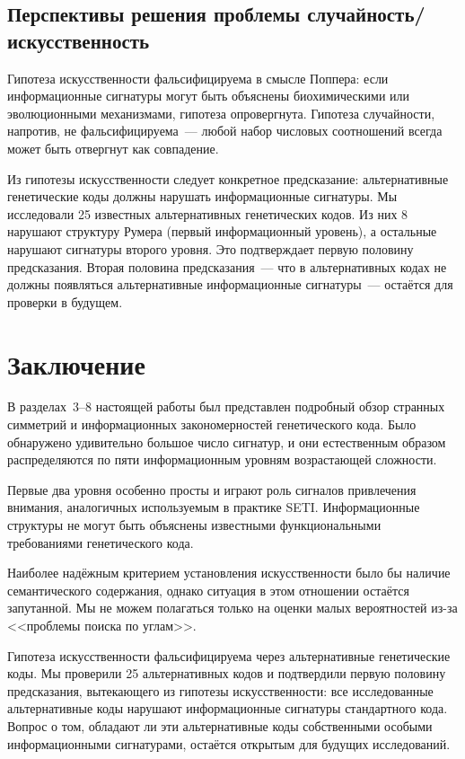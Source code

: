 \documentclass[12pt]{article}
\begin{document}
\subsection{Перспективы решения проблемы случайность/искусственность}

Гипотеза искусственности фальсифицируема в смысле Поппера: если информационные сигнатуры могут быть объяснены биохимическими или эволюционными механизмами, гипотеза опровергнута. Гипотеза случайности, напротив, не фальсифицируема~--- любой набор числовых соотношений всегда может быть отвергнут как совпадение.

Из гипотезы искусственности следует конкретное предсказание: альтернативные генетические коды должны нарушать информационные сигнатуры. Мы исследовали 25 известных альтернативных генетических кодов. Из них 8 нарушают структуру Румера (первый информационный уровень), а остальные нарушают сигнатуры второго уровня. Это подтверждает первую половину предсказания. Вторая половина предсказания~--- что в альтернативных кодах не должны появляться альтернативные информационные сигнатуры~--- остаётся для проверки в будущем.


\section{Заключение}

В разделах~3--8 настоящей работы был представлен подробный обзор странных симметрий и информационных закономерностей генетического кода. Было обнаружено удивительно большое число сигнатур, и они естественным образом распределяются по пяти информационным уровням возрастающей сложности.

Первые два уровня особенно просты и играют роль сигналов привлечения внимания, аналогичных используемым в практике SETI. Информационные структуры не могут быть объяснены известными функциональными требованиями генетического кода.

Наиболее надёжным критерием установления искусственности было бы наличие семантического содержания, однако ситуация в этом отношении остаётся запутанной. Мы не можем полагаться только на оценки малых вероятностей из-за <<проблемы поиска по углам>>.

Гипотеза искусственности фальсифицируема через альтернативные генетические коды. Мы проверили 25 альтернативных кодов и подтвердили первую половину предсказания, вытекающего из гипотезы искусственности: все исследованные альтернативные коды нарушают информационные сигнатуры стандартного кода. Вопрос о том, обладают ли эти альтернативные коды собственными особыми информационными сигнатурами, остаётся открытым для будущих исследований.
\end{document}

